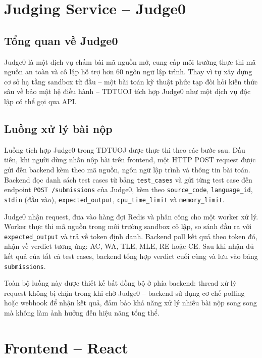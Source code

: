 \documentclass[12pt, a4paper]{report}
\begin{document}
\section{Judging Service -- Judge0}

\subsection{Tổng quan về Judge0}

Judge0 là một dịch vụ chấm bài mã nguồn mở, cung cấp môi trường thực thi mã nguồn an toàn và cô lập hỗ trợ hơn 60 ngôn ngữ lập trình. Thay vì tự xây dựng cơ sở hạ tầng sandbox từ đầu -- một bài toán kỹ thuật phức tạp đòi hỏi kiến thức sâu về bảo mật hệ điều hành -- TDTUOJ tích hợp Judge0 như một dịch vụ độc lập có thể gọi qua \ac{API}.

\subsection{Luồng xử lý bài nộp}

Luồng tích hợp Judge0 trong TDTUOJ được thực thi theo các bước sau. Đầu tiên, khi người dùng nhấn nộp bài trên frontend, một \ac{HTTP} POST request được gửi đến backend kèm theo mã nguồn, ngôn ngữ lập trình và thông tin bài toán. Backend đọc danh sách test cases từ bảng \texttt{test\_cases} và gửi từng test case đến endpoint \texttt{POST /submissions} của Judge0, kèm theo \texttt{source\_code}, \texttt{language\_id}, \texttt{stdin} (đầu vào), \texttt{expected\_output}, \texttt{cpu\_time\_limit} và \texttt{memory\_limit}.

Judge0 nhận request, đưa vào hàng đợi Redis và phân công cho một worker xử lý. Worker thực thi mã nguồn trong môi trường sandbox cô lập, so sánh đầu ra với \texttt{expected\_output} và trả về token định danh. Backend poll kết quả theo token đó, nhận về verdict tương ứng: \ac{AC}, \ac{WA}, \ac{TLE}, \ac{MLE}, \ac{RE} hoặc \ac{CE}. Sau khi nhận đủ kết quả của tất cả test cases, backend tổng hợp verdict cuối cùng và lưu vào bảng \texttt{submissions}.

Toàn bộ luồng này được thiết kế bất đồng bộ ở phía backend: thread xử lý request không bị chặn trong khi chờ Judge0 -- backend sử dụng cơ chế polling hoặc webhook để nhận kết quả, đảm bảo khả năng xử lý nhiều bài nộp song song mà không làm ảnh hưởng đến hiệu năng tổng thể.

\section{Frontend -- React}
\end{document}
